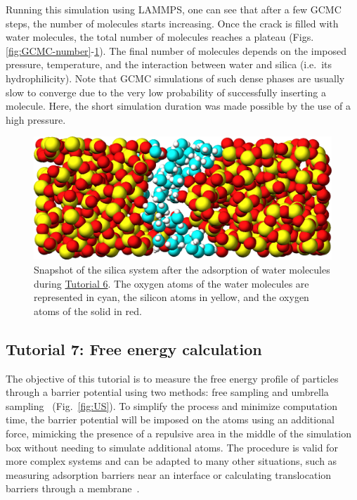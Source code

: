 \documentclass[9pt,tutorial]{livecoms}
\begin{document}
Running this simulation using LAMMPS, one can see that
after a few GCMC steps, the number of molecules starts increasing.  Once the
crack is filled with water molecules, the total number of molecules reaches a plateau
(Figs.\,\ref{fig:GCMC-number}-\ref{fig:GCMC-solvated}).  The final number of
molecules depends on the imposed pressure, temperature, and the interaction
between water and silica (i.e.~its hydrophilicity).  Note that GCMC simulations
of such dense phases are usually slow to converge due to the very low probability
of successfully inserting a molecule.  Here, the short simulation duration was
made possible by the use of a high pressure.

\begin{figure}
\centering
\includegraphics[width=\linewidth]{GCMC-solvated}
\caption{Snapshot of the silica system after the adsorption of water molecules
during \hyperref[gcmc-silica-label]{Tutorial 6}.
The oxygen atoms of the water molecules are represented in cyan, the silicon
atoms in yellow, and the oxygen atoms of the solid in red.}
\label{fig:GCMC-solvated}
\end{figure}

\subsection{Tutorial 7: Free energy calculation}
\label{umbrella-sampling-label}

The objective of this tutorial is to measure the free energy profile of
particles through a barrier potential using two methods: free sampling
and umbrella sampling~\cite{kastner2011umbrella, allen2017computer,
  frenkel2023understanding} (Fig.~\ref{fig:US}).  To simplify the
process and minimize computation time, the barrier potential will be
imposed on the atoms using an additional force, mimicking the presence
of a repulsive area in the middle of the simulation box without needing
to simulate additional atoms.  The procedure is valid for more complex
systems and can be adapted to many other situations, such as measuring
adsorption barriers near an interface or calculating translocation
barriers through a membrane~\cite{wilson1997adsorption,
  makarov2009computer, gravelle2021adsorption, loche2022molecular,
  hayatifar2024probing}.
\end{document}
